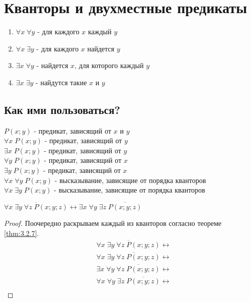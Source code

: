 \section{Кванторы и двухместные предикаты}

\begin{remark}
    \hfill

    \begin{enumerate}
        \item $\forall x \; \forall y$ - для каждого $x$ каждый $y$
        \item $\forall x \; \exists y$ - для каждого $x$ найдется $y$
        \item $\exists x \; \forall y$ - найдется $x$, для которого каждый $y$
        \item $\exists x \; \exists y$ - найдутся такие $x$ и $y$
    \end{enumerate}
\end{remark}

\subsection{Как ими пользоваться?}

$P(x; y)$ - предикат, зависящий от $x$ и $y$ \\
$\forall x \; P(x; y)$ - предикат, зависящий от $y$ \\
$\exists x \; P(x; y)$ - предикат, зависящий от $y$ \\
$\forall y \; P(x; y)$ - предикат, зависящий от $x$ \\
$\exists y \; P(x; y)$ - предикат, зависящий от $x$ \\

$\forall x \; \forall y \; P(x; y)$ - высказывание, зависящие от порядка кванторов \\
$\forall x \; \exists y \; P(x; y)$ - высказывание, зависящие от порядка кванторов \\

\begin{theorem}
    \hfill \break

    $\overline{\forall x \; \exists y \; \forall z \; P(x; y; z)} \leftrightarrow \exists x \; \forall y \; \exists z \; \overline{P(x; y; z)}$
\end{theorem}

\begin{proof}
    Поочередно раскрываем каждый из кванторов согласно теореме \ref{thm:3.2.7}.
    \begin{align*}
        &\overline{\forall x \; \exists y \; \forall z \; P(x; y; z)} \leftrightarrow \\
        &\forall x \; \overline{\exists y \; \forall z \; P(x; y; z)} \leftrightarrow \\
        &\exists x \; \forall y \; \overline{\forall z \; P(x; y; z)} \leftrightarrow \\
        &\forall x \; \forall y \; \exists z \;  \overline{P(x; y; z)} \leftrightarrow \\
    \end{align*}
\end{proof}